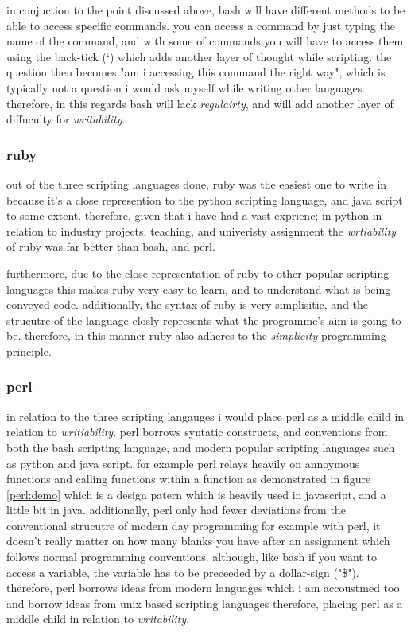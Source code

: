 \documentclass[
	12pt, %
]{fphw}
\begin{document}
in conjuction to the point discussed above, bash will have different methods to
be able to access specific commands. you can access a command by just typing
the name of the command, and with some of commands you will have to access them
using the back-tick (`) which adds another layer of thought  while scripting.
the question then becomes "am i accessing this command the right way", which is
typically not a question i would ask myself while writing other languages.
therefore, in this regards bash will lack \emph{regulairty}, and will add another
layer of diffuculty for \emph{writability}.


\subsubsection{ruby} out of the three scripting languages done, ruby was the
easiest one to write in because it's a close represention to the python scripting
language, and java script to some extent. therefore, given that i have had a
vast exprienc; in python in relation to industry projects, teaching, and
univeristy assignment the \emph{wrtiability} of ruby was far better than bash,
and perl.\par

furthermore, due to the close representation of ruby to other popular scripting
languages this makes ruby very easy to learn, and to understand what is being
conveyed code. additionally, the syntax of ruby is very simplisitic, and the
strucutre of the language closly represents what the programme's aim  is  going
to be. therefore, in this manner ruby also adheres to the \emph{simplicity}
programming principle.

\subsubsection{perl} in relation to the three scripting langauges i would place
perl as a middle child in relation to \emph{writiability}. perl borrows syntatic
constructs, and conventions from both the bash scripting language, and modern
popular scripting languages such as python and java script. for example perl
relays heavily on annoymous functions and calling functions within a function
as demonstrated in figure \ref{perl:demo} which is a design
patern which is heavily used in javascript, and a little bit in java. additionally,
perl only had fewer deviations from the conventional strucutre of modern day programming
for example with perl, it doesn't really matter on how many blanks you have after
an assignment which follows normal programming conventions. although, like bash
if you want to access a variable, the variable has to be preceeded by a dollar-sign
("\$"). therefore, perl borrows ideas from modern languages which i am accoustmed too
and borrow ideas from unix based scripting languages therefore, placing perl as
a middle child in relation to \emph{writability}.
\end{document}
